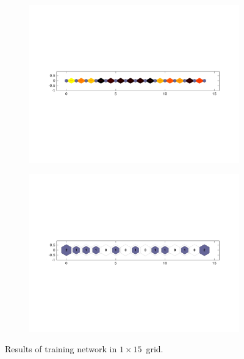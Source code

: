     \begin{figure}
        \begin{subfigure}[b]{0.5\textwidth}
            \centering
            \includegraphics[width=\textwidth]{../images/1d/apps/dist_1_by_15.png}
        \end{subfigure}
        \hfill
        \begin{subfigure}[b]{0.5\textwidth}
             \includegraphics[width=\textwidth]{../images/1d/apps/hit_t_1_by_15.png}
        \end{subfigure}
                \caption{Results of training network in $1\times15$~grid.}
         \label{fig: 1by15T}
    \end{figure}

